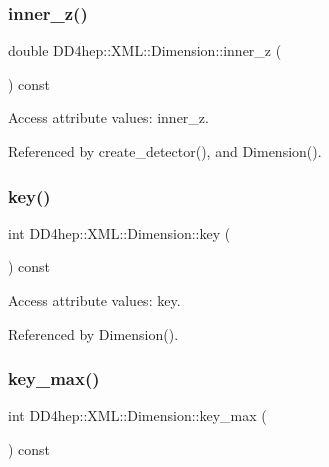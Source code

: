 \subsubsection{\texorpdfstring{inner\+\_\+z()}{inner\_z()}}
{\footnotesize\ttfamily double D\+D4hep\+::\+X\+M\+L\+::\+Dimension\+::inner\+\_\+z (\begin{DoxyParamCaption}{ }\end{DoxyParamCaption}) const}



Access attribute values\+: inner\+\_\+z. 



Referenced by create\+\_\+detector(), and Dimension().

\hypertarget{struct_d_d4hep_1_1_x_m_l_1_1_dimension_a4f371f2d7b5a43b3793c8301d1c70718}{}\label{struct_d_d4hep_1_1_x_m_l_1_1_dimension_a4f371f2d7b5a43b3793c8301d1c70718} 
\subsubsection{\texorpdfstring{key()}{key()}}
{\footnotesize\ttfamily int D\+D4hep\+::\+X\+M\+L\+::\+Dimension\+::key (\begin{DoxyParamCaption}{ }\end{DoxyParamCaption}) const}



Access attribute values\+: key. 



Referenced by Dimension().

\hypertarget{struct_d_d4hep_1_1_x_m_l_1_1_dimension_a1312c2db5e4f58edcf5b20457b5c44ea}{}\label{struct_d_d4hep_1_1_x_m_l_1_1_dimension_a1312c2db5e4f58edcf5b20457b5c44ea} 
\subsubsection{\texorpdfstring{key\+\_\+max()}{key\_max()}}
{\footnotesize\ttfamily int D\+D4hep\+::\+X\+M\+L\+::\+Dimension\+::key\+\_\+max (\begin{DoxyParamCaption}{ }\end{DoxyParamCaption}) const}



